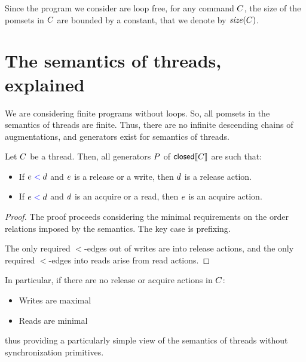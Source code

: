 Since the program we consider are loop free, for any command $C$, the size of the pomsets in $C$ are bounded by a constant, that we denote by $\mathit{size}(C)$.  
 

\section{The semantics  of threads, explained}
We are considering finite programs without loops.  So,  all pomsets in the semantics of threads are finite.  Thus, there are no infinite descending chains of augmentations, and  generators exist for semantics of threads.

\begin{lemma}
Let $C$ be a thread.  Then, all generators $P$ of  $\textsf{closed}\llbracket C\rrbracket$  are such that:
\begin{itemize}
\item  If $e\mathrel{{\color{blue}<}}d$ and $e$ is a release or a write, then $d$ is a release action.
\item  If $e\mathrel{{\color{blue}<}}d$ and $d$ is an acquire or a read, then $e$ is an acquire action.
            
\end{itemize}
\end{lemma}
\begin{proof}
The proof proceeds considering the minimal requirements on the order relations imposed by the semantics.  The key case is prefixing.  

The only required $\lt$-edges out of writes are into release actions, and the only required $\lt$-edges into reads arise from read actions. 
\end{proof}

In particular, if there are no release or acquire actions in $C$:
\begin{itemize}
\item Writes are maximal
\item Reads are minimal
\end{itemize}
thus providing a particularly simple view of the semantics of threads without synchronization primitives.   

